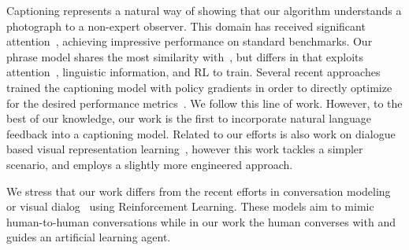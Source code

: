 Captioning represents a natural way of showing that our algorithm understands a photograph to a non-expert observer. This domain has received significant attention~\cite{Karpathy15,Xu15,DBLP:journals/corr/KirosSZ14}, achieving impressive performance on standard benchmarks.  
Our phrase model shares the most similarity with~\cite{Lebret15}, but differs  in that exploits attention~\cite{Xu15}, linguistic information, and RL to train. 
Several recent approaches trained the captioning model with policy gradients in order to directly optimize for the desired performance metrics~\cite{Spider,Selfcritical,Dai17}. We follow this line of work. However, to the best of our knowledge, our work is the first to incorporate natural language feedback into a captioning model. Related to our efforts is also work on dialogue based visual representation learning~\cite{yu16,yu17}, however this work tackles a simpler scenario, and employs a slightly more engineered approach.

We stress that our work differs from the recent efforts in conversation modeling~\cite{Li16} or visual dialog~\cite{Das16} using Reinforcement Learning. These models aim to mimic human-to-human conversations while in our work the human converses with and guides an artificial learning agent. %